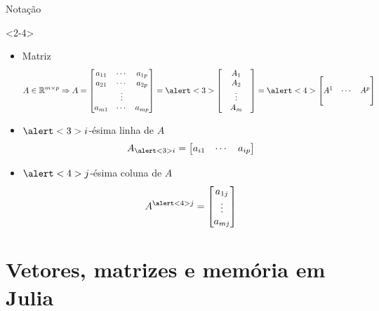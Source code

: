 \documentclass[]{beamer}
\newcommand{\R}{\mathbb{R}}
\begin{document}
\begin{frame}{Notação}
  \begin{onlyenv}<2-4>
    \begin{itemize}
    \item Matriz
      \[
      A \in \R^{m \times p} \Rightarrow A =
      \begin{bmatrix}
        a_{11} & \cdots & a_{1p}\\
        a_{21} & \cdots & a_{2p}\\
        & \vdots & \\
        a_{m1} & \cdots & a_{mp}
      \end{bmatrix}
      =
      \alert<3>{
        \begin{bmatrix}
          & A_1 & \\
          & A_2 & \\
          & \vdots & \\
          & A_m &
        \end{bmatrix} 
      }
      =
      \alert<4>{
        \begin{bmatrix}
          & & \\
          A^1 & \cdots & A^p \\
          &  &
        \end{bmatrix}
      }      
      \]
    \item $\alert<3>{i}$-ésima linha de $A$
      \[
      A_{\alert<3>{i}} =
      \begin{bmatrix}
        a_{i1} & \cdots & a_{ip}
      \end{bmatrix}
      \]
    \item $\alert<4>{j}$-ésima coluna de $A$
      \[
      A^{\alert<4>{j}} =
      \begin{bmatrix}
        a_{1j}\\ \vdots\\ a_{mj}
      \end{bmatrix}
      \]
    \end{itemize}
  \end{onlyenv}

\end{frame}

\section{Vetores, matrizes e memória em Julia}
\end{document}
